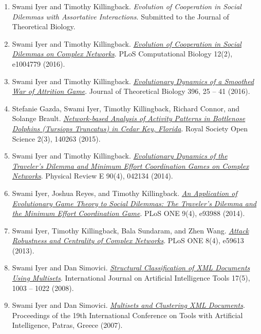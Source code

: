 \documentclass[12pt]{article}
\newenvironment{outerlist}[1][\enskip\textbullet]%
        {\begin{enumerate}[#1]}{\end{enumerate}%
         \vspace{-.6\baselineskip}}
\begin{document}
\begin{outerlist}
\item Swami Iyer and Timothy Killingback. \textit{Evolution of Cooperation in Social Dilemmas with Assortative Interactions}. Submitted to the Journal of Theoretical Biology.

\item Swami Iyer and Timothy Killingback. \textit{\href{http://dx.doi.org/10.1371/journal.pcbi.1004779}{Evolution of Cooperation in Social Dilemmas on Complex Networks}}. PLoS Computational Biology 12(2), e1004779 (2016).

\item Swami Iyer and Timothy Killingback. \textit{\href{http://dx.doi.org/10.1016/j.jtbi.2016.02.014}{Evolutionary Dynamics of a Smoothed War of Attrition Game}}. Journal of Theoretical Biology 396, 25 -- 41 (2016).

\item Stefanie Gazda, Swami Iyer, Timothy Killingback, Richard Connor, and Solange Brault. \textit{\href{http://dx.doi.org/10.1098/rsos.140263}{Network-based Analysis of Activity Patterns in Bottlenose Dolphins (Tursiops Truncatus) in Cedar Key, Florida}}. Royal Society Open Science 2(3), 140263 (2015).

\item Swami Iyer and Timothy Killingback. \textit{\href{http://dx.doi.org/10.1103/PhysRevE.90.042134}{Evolutionary Dynamics of the Traveler's Dilemma and Minimum Effort Coordination Games on Complex Networks}}. Physical Review E 90(4), 042134 (2014).

\item Swami Iyer, Joshua Reyes, and Timothy Killingback. \textit{\href{http://dx.doi.org/10.1371/journal.pone.0093988}{An Application of Evolutionary Game Theory to Social Dilemmas: The Traveler's Dilemma and the Minimum Effort Coordination Game}}. PLoS ONE 9(4), e93988 (2014).

\item Swami Iyer, Timothy Killingback, Bala Sundaram, and Zhen Wang. \textit{\href{http://dx.doi.org/10.1371/journal.pone.0059613}{Attack Robustness and Centrality of Complex Networks}}. PLoS ONE 8(4), e59613 (2013).

\item Swami Iyer and Dan Simovici. \textit{\href{http://www.swamiiyer.net/publications/multisets_long.pdf}{Structural Classification of XML Documents Using Multisets}}. International Journal on Artificial Intelligence Tools 17(5), 1003 -- 1022 (2008).

\item Swami Iyer and Dan Simovici. \textit{\href{http://www.swamiiyer.net/publications/multisets_short.pdf}{Multisets and Clustering XML Documents}}. Proceedings of the 19th International Conference on Tools with Artificial Intelligence, Patras, Greece (2007). 
\end{outerlist}
\end{document}
